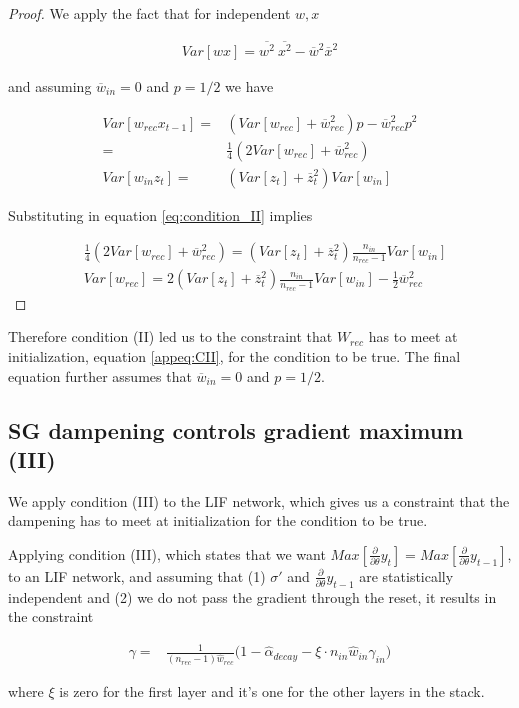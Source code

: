 \begin{proof}
We apply the fact that for independent $w, x$

\begin{align}
    Var[wx] = \overline{w^2}\ \overline{x^2} - \overline{w}^2\overline{x}^2
\end{align}


\noindent and assuming $\overline{w}_{in}=0$ and $p=1/2$ we have

\begin{align}
    Var[w_{rec}x_{t-1}] =& (Var[w_{rec}] + \overline{w}_{rec}^2)p-\overline{w}_{rec}^2p^2 \\ 
    =& \frac{1}{4}(2Var[w_{rec}] + \overline{w}_{rec}^2) \\
    Var[w_{in}z_t] =& (Var[z_t] + \overline{z}_t^2)Var[w_{in}]
\end{align}

Substituting in equation \ref{eq:condition_II} implies 

\begin{align}
    &\frac{1}{4}(2Var[w_{rec}] + \overline{w}_{rec}^2) =  (Var[z_t] + \overline{z}_t^2)\frac{n_{in}}{n_{rec}-1}Var[w_{in}] \\
    &Var[w_{rec}]  =  2(Var[z_t] + \overline{z}_t^2)\frac{n_{in}}{n_{rec}-1}Var[w_{in}] - \frac{1}{2}\overline{w}_{rec}^2 \label{appeq:CII}
\end{align}

\end{proof}

Therefore condition (II) led us to the constraint that $W_{rec}$ has to meet at initialization, equation \ref{appeq:CII}, for the condition to be true. The final equation further assumes that  $\overline{w}_{in}=0$ and $p=1/2$.

\subsection{SG dampening controls gradient maximum (III)}

\label{app:sgmax}

We apply condition (III) to the LIF network, which gives us a constraint that the dampening has to meet at initialization for the condition to be true.

\begin{lemma}\label{thm:cIII}
Applying condition (III), which states that we want $Max[\frac{\partial}{\partial \theta}y_t] = Max[\frac{\partial}{\partial \theta}y_{t-1}]$, to an LIF network, and assuming that (1) $\sigma'$ and $\frac{\partial}{\partial \theta}y_{t-1}$ are statistically independent and (2) we do not pass the gradient through the reset, it results in the constraint  

\begin{align}
    \gamma=&  
    \frac{1}{(n_{rec}-1)\hat{w}_{rec}}\Big( 1 -\hat{\alpha}_{decay} -\xi \cdot n_{in} \hat{w}_{in} \gamma_{in} \Big)
\end{align}

\noindent where $\xi$ is zero for the first layer and it's one for the other layers in the stack.

\end{lemma}

